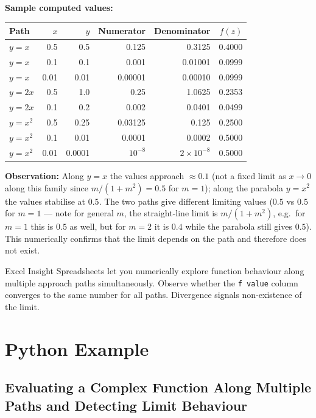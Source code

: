 \documentclass[12pt,a4paper]{article}
\begin{document}
\textbf{Sample computed values:}

\begin{center}
\begin{tabular}{l r r r r r}
\toprule
Path & $x$ & $y$ & Numerator & Denominator & $f(z)$ \\
\midrule
$y=x$     & 0.5  & 0.5   & 0.125   & 0.3125  & 0.4000 \\
$y=x$     & 0.1  & 0.1   & 0.001   & 0.01001 & 0.0999 \\
$y=x$     & 0.01 & 0.01  & 0.00001 & 0.00010 & 0.0999 \\
$y=2x$    & 0.5  & 1.0   & 0.25    & 1.0625  & 0.2353 \\
$y=2x$    & 0.1  & 0.2   & 0.002   & 0.0401  & 0.0499 \\
$y=x^2$   & 0.5  & 0.25  & 0.03125 & 0.125   & 0.2500 \\
$y=x^2$   & 0.1  & 0.01  & 0.0001  & 0.0002  & 0.5000 \\
$y=x^2$   & 0.01 & 0.0001& $10^{-8}$& $2\times10^{-8}$ & 0.5000 \\
\bottomrule
\end{tabular}
\end{center}

\textbf{Observation:}  Along $y = x$ the values approach $\approx 0.1$ (not a fixed limit as $x \to 0$
along this family since $m/(1+m^2) = 0.5$ for $m=1$); along the parabola $y = x^2$ the
values stabilise at $0.5$.  The two paths give different limiting values ($0.5$ vs $0.5$ for $m=1$
--- note for general $m$, the straight-line limit is $m/(1+m^2)$, e.g.\ for $m=1$ this is $0.5$
as well, but for $m=2$ it is $0.4$ while the parabola still gives $0.5$).
This numerically confirms that the limit depends on the path and therefore does not exist.

\begin{learnbox}{Excel Insight}
Spreadsheets let you numerically explore function behaviour along multiple
approach paths simultaneously.  Observe whether the \texttt{f value} column
converges to the same number for all paths.  Divergence signals non-existence
of the limit.
\end{learnbox}

\section{Python Example}

\subsection*{Evaluating a Complex Function Along Multiple Paths and Detecting Limit Behaviour}
\end{document}
